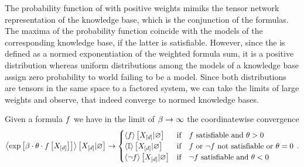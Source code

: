 The probability function of \MarkovLogicNetworks{} with positive weights mimiks the tensor network representation of the knowledge base, which is the conjunction of the formulas.
The maxima of the probability function coincide with the models of the corresponding knowledge base, if the latter is satisfiable.
However, since the \MarkovLogicNetwork{} is defined as a normed exponentiation of the weighted formula sum, it is a positive distribution whereas uniform distributions among the models of a knowledge base assign zero probability to world failing to be a model.
Since both distributions are tensors in the same space to a factored system, we can take the limits of large weights and observe, that \MarkovLogicNetworks{} indeed converge to normed knowledge bases.

\begin{lemma}
    \label{lem:localHardLimit}
    Given a formula $f$ we have in the limit of $\beta\rightarrow\infty$ the coordinatewise convergence
    \begin{align*}
        \left\langle \mathrm{exp}\left[\beta\cdot\theta\cdot f\left[X_{[d]}\right]\right]\right\rangle \left[ X_{[d]} | \varnothing \right] \rightarrow
        \begin{cases}
            \left\langle f\right\rangle \left[ X_{[d]} | \varnothing \right] & \text{if}\quad \text{$f$ satisfiable and } \theta>0\\
            \left\langle \mathbb{I}\right\rangle \left[ X_{[d]} | \varnothing \right] & \text{if}\quad \text{$f$ or $\lnot f$ not satisfiable or } \theta=0 \\
            \left\langle \lnot f\right\rangle \left[ X_{[d]} | \varnothing \right] & \text{if}\quad \text{$\lnot f$ satisfiable and } \theta<0\\
        \end{cases} \, .
    \end{align*}
\end{lemma}
